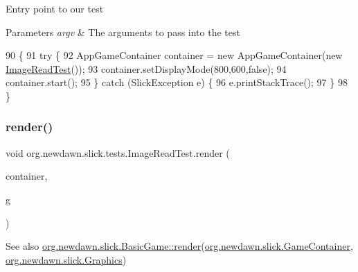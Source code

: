 Entry point to our test


\begin{DoxyParams}{Parameters}
{\em argv} & The arguments to pass into the test \\
\hline
\end{DoxyParams}

\begin{DoxyCode}
90                                            \{
91         \textcolor{keywordflow}{try} \{
92             AppGameContainer container = \textcolor{keyword}{new} AppGameContainer(\textcolor{keyword}{new} \mbox{\hyperlink{classorg_1_1newdawn_1_1slick_1_1tests_1_1_image_read_test_ac33f59aec733dc068e8838a4da22bcf9}{ImageReadTest}}());
93             container.setDisplayMode(800,600,\textcolor{keyword}{false});
94             container.start();
95         \} \textcolor{keywordflow}{catch} (SlickException e) \{
96             e.printStackTrace();
97         \}
98     \}
\end{DoxyCode}
\mbox{\label{classorg_1_1newdawn_1_1slick_1_1tests_1_1_image_read_test_a994bae008ffc8f225a9cd5a96d2e9359}} 
\subsubsection{\texorpdfstring{render()}{render()}}
{\footnotesize\ttfamily void org.\+newdawn.\+slick.\+tests.\+Image\+Read\+Test.\+render (\begin{DoxyParamCaption}\item[{\mbox{\hyperlink{classorg_1_1newdawn_1_1slick_1_1_game_container}{Game\+Container}}}]{container,  }\item[{\mbox{\hyperlink{classorg_1_1newdawn_1_1slick_1_1_graphics}{Graphics}}}]{g }\end{DoxyParamCaption})\hspace{0.3cm}{\ttfamily [inline]}}

\begin{DoxySeeAlso}{See also}
\mbox{\hyperlink{interfaceorg_1_1newdawn_1_1slick_1_1_game_af1a4670d43eb3ba04dfcf55ab1975b64}{org.\+newdawn.\+slick.\+Basic\+Game\+::render}}(\mbox{\hyperlink{classorg_1_1newdawn_1_1slick_1_1_game_container}{org.\+newdawn.\+slick.\+Game\+Container}}, \mbox{\hyperlink{classorg_1_1newdawn_1_1slick_1_1_graphics}{org.\+newdawn.\+slick.\+Graphics}}) 
\end{DoxySeeAlso}


